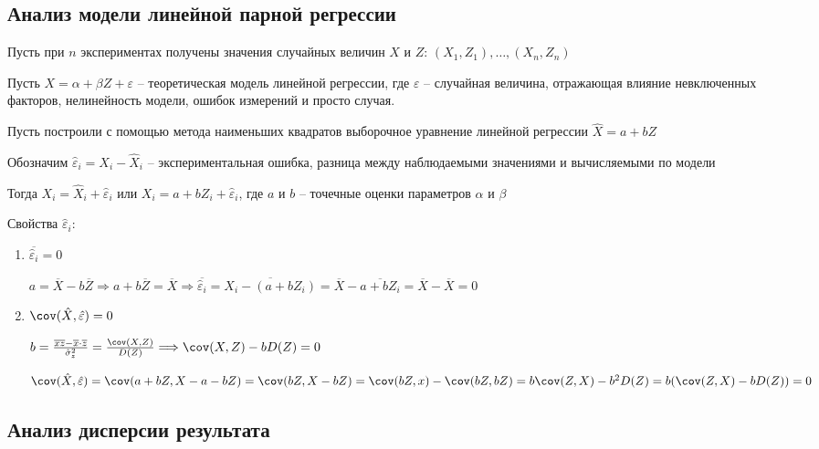 \subsection{Анализ модели линейной парной регрессии}

Пусть при $n$ экспериментах получены значения случайных величин $X$ и $Z$: $(X_1, Z_1), \dots, (X_n, Z_n)$

Пусть $X = \alpha + \beta Z + \varepsilon$ -- теоретическая модель линейной регрессии, где $\varepsilon$ -- случайная величина,
отражающая влияние невключенных факторов, нелинейность модели, ошибок измерений и просто случая.

Пусть построили с помощью метода наименьших квадратов выборочное уравнение линейной регрессии $\hat X = a + b Z$

Обозначим $\hat \varepsilon_i = X_i - \hat X_i$ -- экспериментальная ошибка, разница между наблюдаемыми значениями и 
вычисляемыми по модели

Тогда $X_i = \hat X_i + \hat \varepsilon_i$ или $X_i = a + b Z_i + \hat \varepsilon_i$, где $a$ и $b$ -- точечные оценки параметров $\alpha$ и $\beta$

Свойства $\hat \varepsilon_i$:

\begin{enumerate}
    \item $\overline{\hat \varepsilon_i} = 0$

    \begin{MyProof}
        $a = \overline{X} - b \overline{Z} \Longrightarrow a + b \overline{Z} = \overline{X} \Longrightarrow \overline{\hat \varepsilon_i} = \overline{X_i - (a + b Z_i)} = \overline{X} - \overline{a + b Z_i} = \overline{X} - \overline{X} = 0$
    \end{MyProof}

    \item $\cov (\hat X, \hat \varepsilon) = 0$

    \begin{MyProof}
        $b = \frac{\overline{xz} - \overline{x} \cdot \overline{z}}{\hat \sigma^2_z} = \frac{\cov (X, Z)}{D(Z)} \Longrightarrow \cov (X, Z) - b D(Z) = 0$

        $\cov (\hat X, \hat \varepsilon) = \cov (a + b Z, X - a - bZ) = \cov (bZ, X - bZ) = \cov (bZ, x) - \cov (bZ, bZ) = b \cov (Z, X) - b^2 D(Z) = b (\cov (Z, X) - b D(Z)) = 0$
    \end{MyProof}
\end{enumerate}

\subsection{Анализ дисперсии результата}

